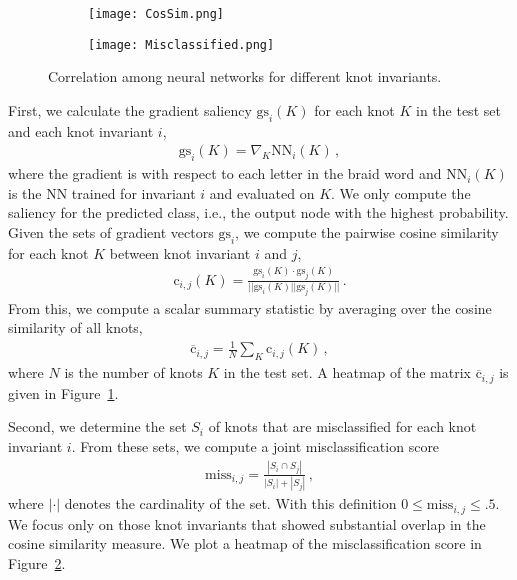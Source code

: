 \documentclass[11pt]{article}
\numberwithin{equation}{section}
\begin{document}
\begin{figure}[t]
    \begin{subfigure}{0.48\textwidth}
    \centering
    \texttt{[image: CosSim.png]}
    \label{fig:CosineSimilarity}
    \end{subfigure}
    \quad
    \begin{subfigure}{0.48\textwidth}
    \centering
    \texttt{[image: Misclassified.png]}
    \label{fig:MisclassificationScore}
    \end{subfigure}
\caption{Correlation among neural networks for different knot invariants.}
\label{fig:Correlations}
\end{figure}

First, we calculate the gradient saliency $\text{gs}_i(K)$ for each knot $K$ in the test set and each knot invariant $i$,
\begin{align}
    \text{gs}_i(K) = \nabla_K \text{NN}_i(K)\,,
\end{align}
where the gradient is with respect to each letter in the braid word and $\text{NN}_i(K)$ is the NN trained for invariant $i$ and evaluated on $K$. We only compute the saliency for the predicted class, i.e., the output node with the highest probability. Given the sets of gradient vectors $\text{gs}_i$, we compute the pairwise cosine similarity for each knot $K$ between knot invariant $i$ and $j$,
\begin{align}
    \text{c}_{i,j}(K) = \frac{\text{gs}_{i}(K) \cdot \text{gs}_{j}(K)}{||\text{gs}_{i}(K)|| \text{gs}_{j}(K)||}\,.
\end{align}
From this, we compute a scalar summary statistic by averaging over the cosine similarity of all knots,
\begin{align}
    \overline{\text{c}}_{i,j} = \frac{1}{N}\sum_{K}\text{c}_{i,j}(K)\,,
\end{align}
where $N$ is the number of knots $K$ in the test set. A heatmap of the matrix $\overline{\text{c}}_{i,j}$ is given in Figure~\ref{fig:CosineSimilarity}.

Second, we determine the set $S_i$ of knots that are misclassified for each knot invariant $i$. From these sets, we compute a joint misclassification score
\begin{align}
    \text{miss}_{i,j} = \frac{|S_i\cap S_j|}{|S_i|+|S_j|}\,,
\end{align}
where $|\cdot|$ denotes the cardinality of the set. With this definition $0\leq \text{miss}_{i,j} \leq .5$. We focus only on those knot invariants that showed substantial overlap in the cosine similarity measure. We plot a heatmap of the misclassification score in Figure~\ref{fig:MisclassificationScore}.
\end{document}
